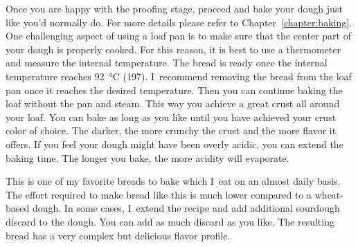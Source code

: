 Once you are happy with the proofing stage, proceed and bake your dough
just like you'd normally do. For more details please refer to 
Chapter~\ref{chapter:baking}. One challenging aspect
of using a loaf pan is to make sure that the center part of your
dough is properly cooked. For this reason, it is best to use a thermometer
and measure the internal temperature. The bread is
ready once the internal temperature reaches  \qty{92}{\degreeCelsius} (\qty{197}{\degF}). I~recommend
removing the bread from the loaf pan once it reaches the desired
temperature. Then you can continue baking the loaf without the pan and
steam. This way you achieve a great crust all around your
loaf. You can bake as long as you like until you have achieved
your crust color of choice. The darker, the more crunchy
the crust and the more flavor it offers. If you feel your
dough might have been overly acidic, you can extend the baking time.
The longer you bake, the more acidity will evaporate.

This is one of my favorite breads to bake which I~eat on an
almost daily basis. The effort required to make bread like
this is much lower compared to a wheat-based dough. In some
cases, I~extend the recipe and add additional sourdough discard
to the dough. You can add as much discard as you like. The resulting
bread has a very complex but delicious flavor profile.
